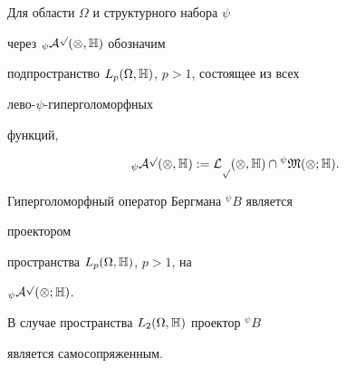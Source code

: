  


\begin{defnnonum} Для области $\Omega$ и структурного набора $\psi$ 


через ${}_\psi\cal A^p(\Omega,\Bbb H)$ обозначим 


подпространство $L_p(\Omega,\Bbb H)$, $p>1$, состоящее из всех 


лево-$\psi$-гиперголоморфных 


функций, 


$$ 


{}_\psi\cal A^p(\Omega,\Bbb H):=L_p(\Omega,\Bbb H)\cap 


{}^{\psi}\frak M(\Omega;\Bbb H). 


$$ 


\end{defnnonum} 


 


\begin{thm} Гиперголоморфный оператор Бергмана ${}^\psi B$ является 


проектором 


пространства $L_p(\Omega,\Bbb H)$, $p>1$, на 


${}_\psi\cal A^p(\Omega;\Bbb H)$. 


 


В случае пространства $L_2(\Omega,\Bbb H)$ проектор ${}^\psi B$ 


является самосопряженным. 


\end{thm} 


 


